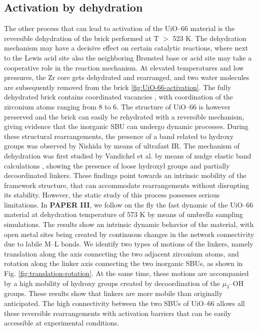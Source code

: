 \subsection{Activation by dehydration}
The other process that can lead to activation of the UiO--66 material is the reversible dehydration of the brick performed at T $>$ 523 K.  The dehydration mechanism may have a decisive effect on certain catalytic reactions, where next to the Lewis acid site also the neighboring Br\o{}nsted base or acid site may take a cooperative role in the reaction mechanism. At elevated temperatures and low pressures, the Zr core gets dehydrated and rearranged, and two water molecules are subsequently removed from the brick \ref{fig:UiO-66-activation}. The fully dehydrated  brick contains coordinated vacancies \cite{valenzano2011disclosing, decoste2013stability, shearer2013situ, vandichel2015active}, with coordination of the zirconium atoms ranging from 8 to 6. The structure of UiO--66 is however preserved and the brick can easily be rehydrated with a reversible mechanism, giving evidence that the inorganic SBU can undergo dynamic processes. During these structural rearrangements, the presence of a band related to hydroxy groups was observed by Nishida by means of ultrafast IR\cite{nishida2014structural}. The mechanism of dehydration was first studied by Vandichel et al. by means of nudge elastic band calculations \cite{vandichel2016water}, showing the presence of loose hydroxyl groups and partially decoordinated linkers. These findings point towards an intrinsic mobility of the framework structure, that can accommodate rearrangements without disrupting its stability. However, the static study of this process possesses serious limitations. 
\npar
In \textbf{PAPER III}, we follow on the fly the fast dynamic of the UiO--66 material at dehydration temperature of 573 K by means of umbrella sampling simulations.  The results show an intrinsic dynamic behavior of the material, with open metal sites being created by continuous changes in the network connectivity due to labile M--L bonds. We identify two types of motions of the linkers, namely translation along the axis connecting the two adjacent zirconium atoms, and rotation along the linker axis connecting the two inorganic SBUs, as shown in Fig. \ref{fig:translation-rotation}. At the same time, these motions are accompanied by a high mobility of hydroxy groups created by decoordination of the $\mu_3$--OH groups. These results show that linkers are more mobile than originally anticipated. The high connectivity between the two SBUs of UiO--66 allows all these reversible rearrangements with activation barriers that can be easily accessible at experimental conditions. 
